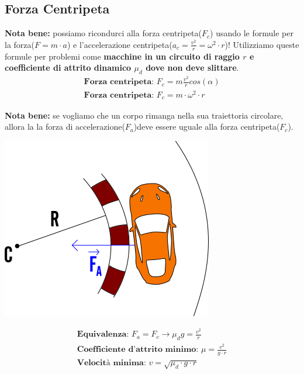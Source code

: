 \subsection{Forza Centripeta}
\textbf{Nota bene: } possiamo ricondurci alla forza centripeta($F_c$) usando le formule per la forza($F = m \cdot a$) e l'accelerazione centripeta($a_c = \frac{v^2}{r} = \omega^2 \cdot r $)! Utilizziamo queste formule per problemi come \textbf{macchine in un circuito di raggio $r$ e coefficiente di attrito dinamico $\mu_d$ dove non deve slittare}.
\\
\begin{gather*}
    \textbf{Forza centripeta: } F_c = m \frac{v^2}{r} cos (\alpha) \\
    \textbf{Forza centripeta: } F_c = m \cdot \omega^2 \cdot r
\end{gather*}

\textbf{Nota bene: } se vogliamo che un corpo rimanga nella sua traiettoria circolare, allora la la forza di accelerazione($F_a$)deve essere uguale alla forza centripeta($F_c$).

\begin{center}
\includegraphics[width=0.7 \linewidth]
{Dinamica/forza-centripeta.png}
\end{center}
\begin{gather*}
    \textbf{Equivalenza: } F_a = F_c \rightarrow \mu_d  g = \frac{v^2}{r} \\
    \textbf{Coefficiente d'attrito minimo: } \mu = \frac{v^2}{g \cdot r} \\
    \textbf{Velocità minima: } v = \sqrt{\mu_d \cdot g \cdot r}
\end{gather*}